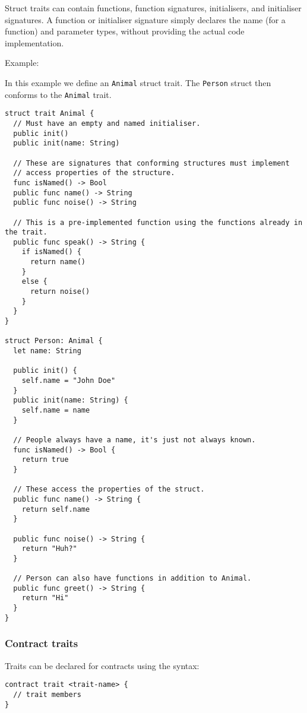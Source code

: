 Struct traits can contain functions, function signatures, initialisers, and initialiser signatures. A function or initialiser signature simply declares the name (for a function) and parameter types, without providing the actual code implementation.

Example:

In this example we define an \texttt{Animal} struct trait. The \texttt{Person} struct then conforms to the \texttt{Animal} trait.

\begin{verbatim}
struct trait Animal {
  // Must have an empty and named initialiser.
  public init()
  public init(name: String)

  // These are signatures that conforming structures must implement
  // access properties of the structure.
  func isNamed() -> Bool
  public func name() -> String
  public func noise() -> String

  // This is a pre-implemented function using the functions already in the trait.
  public func speak() -> String {
    if isNamed() {
      return name()
    }
    else {
      return noise()
    }
  }
}

struct Person: Animal {
  let name: String

  public init() {
    self.name = "John Doe"
  }
  public init(name: String) {
    self.name = name
  }

  // People always have a name, it's just not always known.
  func isNamed() -> Bool {
    return true
  }

  // These access the properties of the struct.
  public func name() -> String {
    return self.name
  }

  public func noise() -> String {
    return "Huh?"
  }

  // Person can also have functions in addition to Animal.
  public func greet() -> String {
    return "Hi"
  }
}
\end{verbatim}

\subsubsection{Contract traits}
\label{sec:appendix-b-contract-traits}

Traits can be declared for contracts using the syntax:

\begin{verbatim}
contract trait <trait-name> {
  // trait members
}
\end{verbatim}

